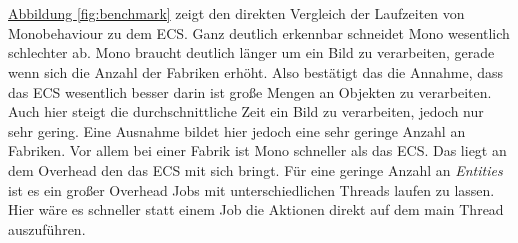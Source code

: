 \\\\
\hyperref[fig:benchmark]{Abbildung \ref*{fig:benchmark}} zeigt den direkten Vergleich der Laufzeiten von Monobehaviour zu dem ECS. Ganz deutlich erkennbar schneidet Mono wesentlich schlechter ab. Mono braucht deutlich länger um ein Bild zu verarbeiten, gerade wenn sich die Anzahl der Fabriken erhöht. Also bestätigt das die Annahme, dass das ECS wesentlich besser darin ist große Mengen an Objekten zu verarbeiten. Auch hier steigt die durchschnittliche Zeit ein Bild zu verarbeiten, jedoch nur sehr gering. Eine Ausnahme bildet hier jedoch eine sehr geringe Anzahl an Fabriken. Vor allem bei einer Fabrik ist Mono schneller als das ECS. Das liegt an dem Overhead den das ECS mit sich bringt. Für eine geringe Anzahl an \textit{Entities} ist es ein großer Overhead Jobs mit unterschiedlichen Threads laufen zu lassen. Hier wäre es schneller statt einem Job die Aktionen direkt auf dem main Thread auszuführen.